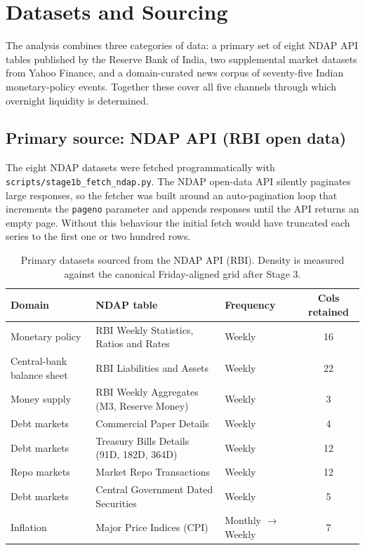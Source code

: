 \section{Datasets and Sourcing}
\label{sec:data}

The analysis combines three categories of data: a primary set of eight
NDAP API tables published by the Reserve Bank of India, two
supplemental market datasets from Yahoo Finance, and a domain-curated
news corpus of seventy-five Indian monetary-policy events. Together
these cover all five channels through which overnight liquidity is
determined.

\subsection{Primary source: NDAP API (RBI open data)}

The eight NDAP datasets were fetched programmatically with
\texttt{scripts/stage1b\_fetch\_ndap.py}. The NDAP open-data API silently
paginates large responses, so the fetcher was built around an
auto-pagination loop that increments the \texttt{pageno} parameter and
appends responses until the API returns an empty page. Without this
behaviour the initial fetch would have truncated each series to the
first one or two hundred rows.

\begin{table}[H]
\caption{Primary datasets sourced from the NDAP API (RBI). Density is
  measured against the canonical Friday-aligned grid after Stage 3.}
\label{tab:ndap-sources}
\renewcommand{\arraystretch}{1.2}
\begin{tabularx}{\linewidth}{@{} l Y l c @{}}
\toprule
{}\color{white}\textbf{Domain} &
\color{white}\textbf{NDAP table} &
\color{white}\textbf{Frequency} &
\color{white}\textbf{Cols retained} \\
\midrule
Monetary policy & RBI Weekly Statistics, Ratios and Rates & Weekly & 16 \\
Central-bank balance sheet & RBI Liabilities and Assets & Weekly & 22 \\
Money supply & RBI Weekly Aggregates (M3, Reserve Money) & Weekly & 3 \\
Debt markets & Commercial Paper Details & Weekly & 4 \\
Debt markets & Treasury Bills Details (91D, 182D, 364D) & Weekly & 12 \\
Repo markets & Market Repo Transactions & Weekly & 12 \\
Debt markets & Central Government Dated Securities & Weekly & 5 \\
Inflation & Major Price Indices (CPI) & Monthly $\to$ Weekly & 7 \\
\bottomrule
\end{tabularx}
\end{table}


